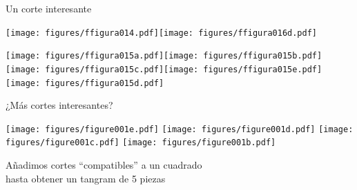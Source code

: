 \documentclass[14pt,aspectratio=169,usenames,dvipsnames]{beamer}
\begin{document}

    \begin{frame}{Un corte interesante}
        \begin{center}
            \texttt{[image: figures/ffigura014.pdf]}\qquad\qquad\texttt{[image: figures/ffigura016d.pdf]} \\

            \vspace{2.5em}

            \texttt{[image: figures/ffigura015a.pdf]}\quad\texttt{[image: figures/ffigura015b.pdf]}\quad\texttt{[image: figures/ffigura015c.pdf]}\;\;\texttt{[image: figures/ffigura015e.pdf]}\quad\texttt{[image: figures/ffigura015d.pdf]}\\
        \end{center}
    \end{frame}


    \begin{frame}{¿Más cortes interesantes?}
        \begin{center}
            \texttt{[image: figures/figure001e.pdf]} \quad \texttt{[image: figures/figure001d.pdf]} \quad \texttt{[image: figures/figure001c.pdf]} \quad \texttt{[image: figures/figure001b.pdf]} \\
            \vspace{1.5em}

            Añadimos cortes ``compatibles'' a un cuadrado\\hasta obtener un tangram de 5 piezas
        \end{center}
    \end{frame}

\end{document}
